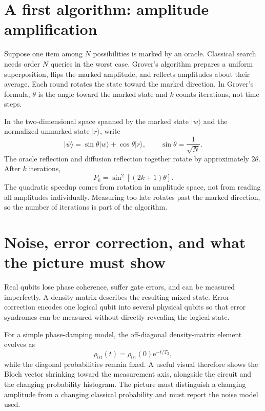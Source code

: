 \documentclass[11pt,oneside]{book}
\newcommand{\ee}{\mathrm{e}}
\newcommand{\ket}[1]{\lvert #1\rangle}
\theoremstyle{reviewstyle}
\begin{document}
\section{A first algorithm: amplitude amplification}
Suppose one item among $N$ possibilities is marked by an oracle. Classical search needs order $N$ queries in the worst case. Grover's algorithm prepares a uniform superposition, flips the marked amplitude, and reflects amplitudes about their average. Each round rotates the state toward the marked direction. In Grover's formula, $\theta$ is the angle toward the marked state and $k$ counts iterations, not time steps.

In the two-dimensional space spanned by the marked state $\ket w$ and the normalized unmarked state $\ket r$, write
\begin{equation}
\ket\psi=\sin\theta\ket w+\cos\theta\ket r,
\qquad \sin\theta=\frac1{\sqrt N}.
\end{equation}
The oracle reflection and diffusion reflection together rotate by approximately $2\theta$. After $k$ iterations,
\begin{equation}
P_k=\sin^2[(2k+1)\theta].
\end{equation}
The quadratic speedup comes from rotation in amplitude space, not from reading all amplitudes individually. Measuring too late rotates past the marked direction, so the number of iterations is part of the algorithm.

\section{Noise, error correction, and what the picture must show}
Real qubits lose phase coherence, suffer gate errors, and can be measured imperfectly. A density matrix describes the resulting mixed state. Error correction encodes one logical qubit into several physical qubits so that error syndromes can be measured without directly revealing the logical state.

For a simple phase-damping model, the off-diagonal density-matrix element evolves as
\begin{equation}
\rho_{01}(t)=\rho_{01}(0)\ee^{-t/T_2},
\end{equation}
while the diagonal probabilities remain fixed. A useful visual therefore shows the Bloch vector shrinking toward the measurement axis, alongside the circuit and the changing probability histogram. The picture must distinguish a changing amplitude from a changing classical probability and must report the noise model used.
\end{document}
